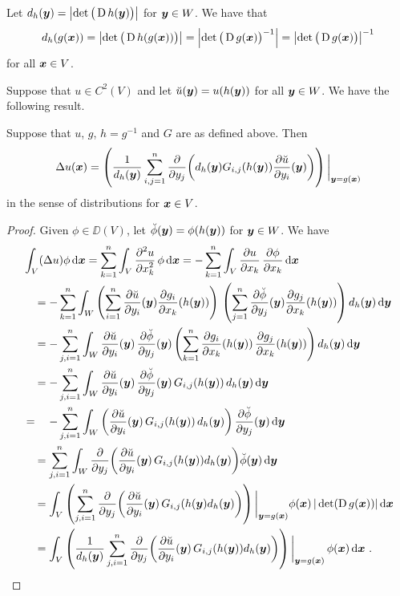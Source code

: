 Let $d_h(\VEC{y}) = \left|\det \big(\diff h(\VEC{y})\big)\right|$
for $\VEC{y} \in W$.  We have that
\[
d_h(g(\VEC{x})) = \left|\det \big(\diff h(g(\VEC{x}))\big)\right|
= \left|\det \big(\diff g(\VEC{x})\big)^{-1} \right|
=\left|\det \big(\diff g(\VEC{x})\big) \right|^{-1}
\]
for all $\VEC{x} \in V$.

Suppose that $\displaystyle u\in C^2(V)$ and let
$\breve{u}(\VEC{y}) = u(h(\VEC{y}))$ for all $\VEC{y} \in W$.
We have the following result.

\begin{prop}
Suppose that $u$, $g$, $\displaystyle h = g^{-1}$ and $G$ are as
defined above.  Then
\begin{equation} \label{pot_chain_rule}
\Delta u (\VEC{x}) = \left(
\frac{1}{d_h(\VEC{y})} \sum_{i,j=1}^n
\pdfdx{ \left( d_h(\VEC{y}) G_{i,j}(h(\VEC{y}))
\pdydx{\breve{u}}{y_i}(\VEC{y})\right)}{y_j} \right)\bigg|_{\VEC{y} = g(\VEC{x})}
\end{equation}
in the sense of distributions for $\VEC{x} \in V$.
\end{prop}

\begin{proof}
Given $\phi \in \DD(V)$, let $\breve{\phi}(\VEC{y}) = \phi(h(\VEC{y}))$
for $\VEC{y} \in W$.  We have
\begin{align*}
&\int_V (\Delta u) \phi \dx{\VEC{x}}
= \sum_{k=1}^n \int_V \pdydxn{u}{x_k}{2}\,\phi \dx{\VEC{x}}
= -\sum_{k=1}^n \int_V \pdydx{u}{x_k}\,\pdydx{\phi}{x_k} \dx{\VEC{x}} \\
&\quad = -\sum_{k=1}^n \int_W \left( \sum_{i=1}^n \pdydx{\breve{u}}{y_i}(\VEC{y})
\pdydx{g_i}{x_k}(h(\VEC{y})) \right)\,
\left( \sum_{j=1}^n \pdydx{\breve{\phi}}{y_j}(\VEC{y})
\pdydx{g_j}{x_k}(h(\VEC{y})) \right) d_h(\VEC{y}) \dx{\VEC{y}} \\
&\quad = - \sum_{j,i=1}^n \int_W \pdydx{\breve{u}}{y_i}(\VEC{y})\,
\pdydx{\breve{\phi}}{y_j}(\VEC{y})
\left( \sum_{k=1}^n \pdydx{g_i}{x_k}(h(\VEC{y}))\,\pdydx{g_j}{x_k}(h(\VEC{y}))
\right) d_h(\VEC{y}) \dx{\VEC{y}} \\
&\quad =- \sum_{j,i=1}^n \int_W \pdydx{\breve{u}}{y_i}(\VEC{y})
\, \pdydx{\breve{\phi}}{y_j}(\VEC{y})
\, G_{i,j}(h(\VEC{y}))\, d_h(\VEC{y}) \dx{\VEC{y}}\\
&=\quad  - \sum_{j,i=1}^n \int_W \left( \pdydx{\breve{u}}{y_i}(\VEC{y})
\, G_{i,j}(h(\VEC{y}))\, d_h(\VEC{y}) \right)
\pdydx{\breve{\phi}}{y_j}(\VEC{y}) \dx{\VEC{y}} \\ 
&\quad = \sum_{j,i=1}^n \int_W \pdfdx{\left( \pdydx{\breve{u}}{y_i}(\VEC{y})
\, G_{i,j}(h(\VEC{y})) d_h(\VEC{y}) \right)}{y_j} \breve{\phi}(\VEC{y})
\dx{\VEC{y}} \\
&\quad = \int_V \left( \sum_{j,i=1}^n \pdfdx{\left(
\pdydx{\breve{u}}{y_i}(\VEC{y}) \, G_{i,j}(h(\VEC{y})
d_h(\VEC{y}) \right)}{y_j} \right)\bigg|_{\VEC{y}=g(\VEC{x})}
\phi(\VEC{x})\, |\det (\diff g(\VEC{x}))| \dx{\VEC{x}} \\
&\quad = \int_V \left(\frac{1}{d_h(\VEC{y})}  \sum_{j,i=1}^n
\pdfdx{\left( \pdydx{\breve{u}}{y_i}(\VEC{y})
\, G_{i,j}(h(\VEC{y})) d_h(\VEC{y}) \right)}{y_j}
\right)\bigg|_{\VEC{y}=g(\VEC{x})} \, \phi(\VEC{x}) \dx{\VEC{x}} \ .  \qedhere
\end{align*}
\end{proof}


